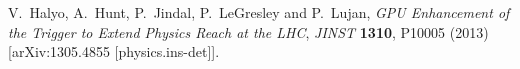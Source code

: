 \documentclass{JHEP3}
\begin{document}
\begin{thebibliography}{99}
%
%
%
%
%
%
%
%
%
%
%

  V.~Halyo, A.~Hunt, P.~Jindal, P.~LeGresley and P.~Lujan,
  \textit{GPU Enhancement of the Trigger to Extend Physics Reach at the
  LHC}, \textit{JINST} {\bf 1310}, P10005 (2013)
  [arXiv:1305.4855 [physics.ins-det]].

\end{thebibliography}
\end{document}
